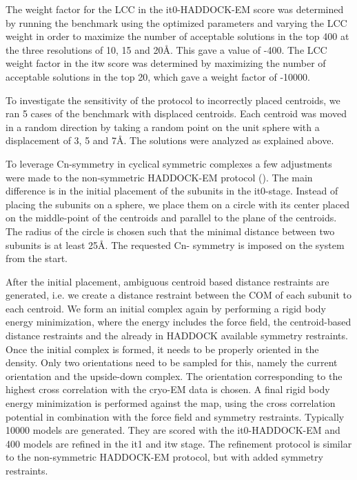 The weight factor for the LCC in the it0-HADDOCK-EM score was determined by
running the benchmark using the optimized parameters and varying the LCC weight
in order to maximize the number of acceptable solutions in the top 400 at the
three resolutions of 10, 15 and 20Å. This gave a value of -400.  The
LCC weight factor in the itw score was determined by maximizing the number of
acceptable solutions in the top 20, which gave a weight factor of -10000.

To investigate the sensitivity of the protocol to incorrectly placed centroids,
we ran 5 cases of the benchmark with displaced centroids.  Each centroid was
moved in a random direction by taking a random point on the unit sphere with a
displacement of 3, 5 and 7Å.  The solutions were analyzed as explained
above.


To leverage Cn-symmetry in cyclical symmetric complexes a few adjustments were
made to the non-symmetric HADDOCK-EM protocol
().  The main difference is in the initial
placement of the subunits in the it0-stage.  Instead of placing the subunits on
a sphere, we place them on a circle with its center placed on the middle-point
of the centroids and parallel to the plane of the centroids.  The radius of the
circle is chosen such that the minimal distance between two subunits is at
least 25Å.  The requested Cn- symmetry is imposed on the system from
the start. 

After the initial placement, ambiguous centroid based distance restraints are
generated, i.e. we create a distance restraint between the COM of each subunit
to each centroid.  We form an initial complex again by performing a rigid body
energy minimization, where the energy includes the force field, the
centroid-based distance restraints and the already in HADDOCK available
symmetry restraints.  Once the initial complex is formed, it needs to be
properly oriented in the density.  Only two orientations need to be sampled for
this, namely the current orientation and the upside-down complex.  The
orientation corresponding to the highest cross correlation with the cryo-EM
data is chosen.  A final rigid body energy minimization is performed against
the map, using the cross correlation potential in combination with the force
field and symmetry restraints.  Typically 10000 models are generated.  They are
scored with the it0-HADDOCK-EM and 400 models are refined in the it1 and itw
stage.  The refinement protocol is similar to the non-symmetric HADDOCK-EM
protocol, but with added symmetry restraints.

